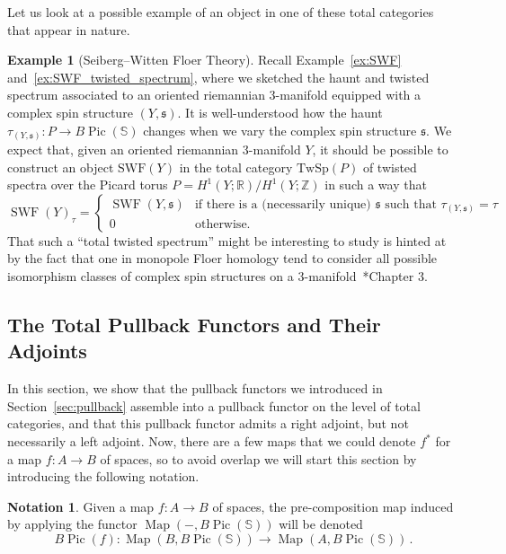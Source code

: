 \documentclass[10pt]{amsart}
\newcommand{\longto}{\longrightarrow}
\theoremstyle{plain}
\theoremstyle{definition}
\newtheorem{notation}[theorem]{Notation}
\newtheorem{example}[theorem]{Example}
\DeclareMathOperator{\Pic}{Pic}
\DeclareMathOperator{\Map}{Map}
\DeclareMathOperator{\SWF}{SWF}
\newcommand{\bR}{\mathbb{R}}
\newcommand{\bS}{\mathbb{S}}
\newcommand{\bZ}{\mathbb{Z}}
\newcommand{\TwSp}{\mathrm{TwSp}}
\begin{document}
Let us look at a possible example of an object in one of these total categories that appear in nature.

\begin{example}[Seiberg--Witten Floer Theory]
  Recall Example~\ref{ex:SWF} and~\ref{ex:SWF_twisted_spectrum}, where we sketched the haunt and twisted spectrum associated to an oriented riemannian 3-manifold equipped with a complex spin structure $(Y,\mathfrak{s})$.
  It is well-understood how the haunt $\tau_{(Y,\mathfrak{s})} : P \to B\Pic(\bS)$ changes when we vary the complex spin structure $\mathfrak{s}$.
  We expect that, given an oriented riemannian 3-manifold $Y$, it should be possible to construct an object $\mathrm{SWF}(Y)$ in the total category $\TwSp(P)$ of twisted spectra over the Picard torus $P = H^1(Y;\bR) /H^1(Y;\bZ)$ in such a way that
  \[
  \SWF(Y)_{\tau} = \begin{cases} \SWF(Y,\mathfrak{s}) & \text{if there is a (necessarily unique) $\mathfrak{s}$ such that $\tau_{(Y,\mathfrak{s})} = \tau$} \\ 0 & \text{otherwise.} \end{cases}
  \]
  That such a ``total twisted spectrum'' might be interesting to study is hinted at by the fact that one in monopole Floer homology tend to consider all possible isomorphism classes of complex spin structures on a 3-manifold~\cite{KM07}*{Chapter 3}.
\end{example}

\subsection{The Total Pullback Functors and Their Adjoints} \label{sec:total_pullback}

In this section, we show that the pullback functors we introduced in Section~\ref{sec:pullback} assemble into a pullback functor on the level of total categories, and that this pullback functor admits a right adjoint, but not necessarily a left adjoint.
Now, there are a few maps that we could denote $f^*$ for a map $f : A \to B$ of spaces, so to avoid overlap we will start this section by introducing the following notation.

\begin{notation}
  Given a map $f : A \to B$ of spaces, the pre-composition map induced by applying the functor $\Map(-,B\Pic(\bS))$ will be denoted
  \[
  B\Pic(f) : \Map(B,B\Pic(\bS)) \longto \Map(A,B\Pic(\bS)) \,.
  \]
\end{notation}
\end{document}
